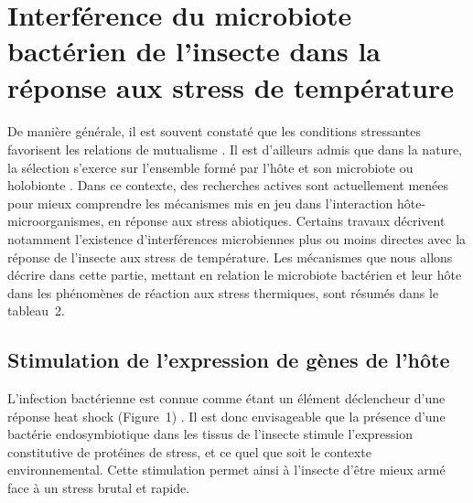\section[Interférences du microbiote de l'insecte dans la réponse aux stress de température]%
{Interférence du microbiote bactérien de l'insecte dans la réponse aux stress de température} 

\paragraph*{}
De manière générale, il est souvent constaté que les conditions stressantes favorisent les relations de mutualisme \cite{meadows2013}.
Il est d'ailleurs admis que dans la nature, la sélection s'exerce sur l'ensemble formé par l'hôte et son microbiote ou holobionte \cite{rosenberg2008}.
Dans ce contexte, des recherches actives sont actuellement menées pour mieux comprendre les mécanismes mis en jeu dans l'interaction hôte-microorganismes, en réponse aux stress abiotiques.
Certains travaux décrivent notamment l'existence d'interférences microbiennes plus ou moins directes avec la réponse de l'insecte aux stress de température.
Les mécanismes que nous allons décrire dans cette partie, mettant en relation le microbiote bactérien et leur hôte dans les phénomènes de réaction aux stress thermiques, sont résumés dans le tableau~2.

\subsection{Stimulation de l'expression de gènes de l'hôte}

L'infection bactérienne est connue comme étant un élément déclencheur d'une réponse heat shock (Figure~1) \cite{sorensen2003}.
Il est donc envisageable que la présence d'une bactérie endosymbiotique dans les tissus de l'insecte stimule l'expression constitutive de protéines de stress, et ce quel que soit le contexte environnemental.
Cette stimulation permet ainsi à l'insecte d'être mieux armé face à un stress brutal et rapide.

